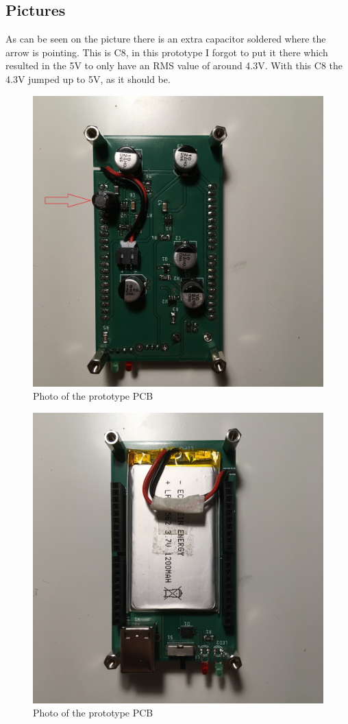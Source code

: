 \documentclass{article}
\begin{document}
 \subsection{Pictures}
 As can be seen on the picture there is an extra capacitor soldered where the arrow is pointing. This is C8, in this prototype I forgot to put it there which resulted in the 5V to only have an RMS value of around 4.3V. With this C8 the 4.3V jumped up to 5V, as it should be.
  \begin{figure}[H]
  	\centering
  	\includegraphics[width=1\linewidth]{IMG_2386.jpg}
  	\caption{Photo of the prototype PCB}
 	 \label{fig: pcb21}
\end{figure}
  \begin{figure}[H]
  	\centering
  	\includegraphics[width=1\linewidth]{IMG_2387.jpg}
  	\caption{Photo of the prototype PCB}
 	 \label{fig: pcb22t}
\end{figure}
\end{document}
